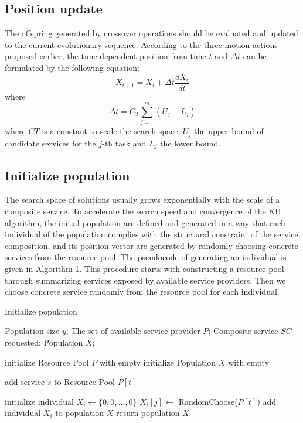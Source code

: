 \documentclass[journal]{IEEEtran}
\begin{document}
\subsection{Position update}
The offspring generated by crossover operations should be evaluated and updated to the current evolutionary sequence.
According to the three motion actions proposed earlier, the time-dependent position from time $t$ and $\Delta t$ can be formulated by the following equation:
\begin{equation}
X_{i+1} = X_i + \Delta t \frac{dX_i}{dt}
\end{equation}
where
\begin{equation}
\Delta t = C_T\sum_{j=1}^{m}(U_j - L_j)
\end{equation}
where $CT$ is a constant to scale the search space, $U_j$ the upper bound of candidate services for the $j$-th task and $L_j$ the lower bound.

\subsection{Initialize population}
The search space of solutions usually grows exponentially with the scale of a composite service. To accelerate the search speed and convergence of the KH algorithm, the initial population are defined and generated in a way that each individual of the population complies with the structural constraint of the service composition, and its position vector are generated by randomly choosing concrete services from the resource pool. The pseudocode of generating an individual is given in Algorithm 1. This procedure starts with constructing a resource pool through summarizing services exposed by available service providers. Then we choose concrete service randomly from the resource pool for each individual. 

\begin{algorithm}
\caption{Initialize population}
\label{Initialize population}
\begin{algorithmic}[1]

\REQUIRE Population size $y$; The set of available service provider $P$; Composite service $SC$ requested;
\ENSURE Population $X$;

\STATE initialize Resource Pool $P$ with empty
\STATE initialize Population $X$ with empty

      \STATE add service $s$ to Resource Pool $P[t]$
    \ENDIF
  \ENDFOR  
\ENDFOR

  \STATE initialize individual $X_i \leftarrow \{0,0,...,0\}$
    \STATE $X_i[j] \leftarrow$ RandomChoose($P[t]$)
  \ENDFOR
  \STATE add individual $X_i$ to population $X$
\ENDFOR
\STATE return population $X$
\end{algorithmic}
\end{algorithm}
\end{document}
